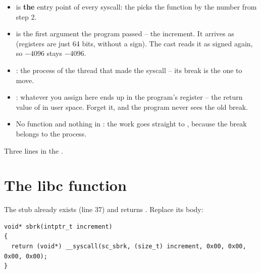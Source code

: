 \documentclass[11pt]{report}
\newcommand{\done}[1]{\begin{keybox}[title={Done when}]#1\end{keybox}}
\begin{document}
\begin{itemize}
  \item {} is \textbf{the} entry point of every syscall: the  picks the
        function by the number from step 2.
  \item {} is the first argument the program passed -- the increment. It arrives as
         (registers are just 64 bits, without a sign). The cast  reads it
        as signed again, so $-4096$ stays $-4096$.
  \item {}: the process of the thread that made the syscall -- its break
        is the one to move.
  \item {}: whatever you assign here ends up in the program's  register --
        the return value of  in user space. Forget it, and the program never sees the old break.
  \item No  function and nothing in : the work goes straight to
        , because the break belongs to the process.
\end{itemize}

\done{Three lines in the .}

\section{The libc function \hfill {\normalsize{}}}

The stub already exists (line 37) and returns . Replace its body:

\begin{lstlisting}
void* sbrk(intptr_t increment)
{
  return (void*) __syscall(sc_sbrk, (size_t) increment, 0x00, 0x00, 0x00, 0x00);
}
\end{lstlisting}
\end{document}
